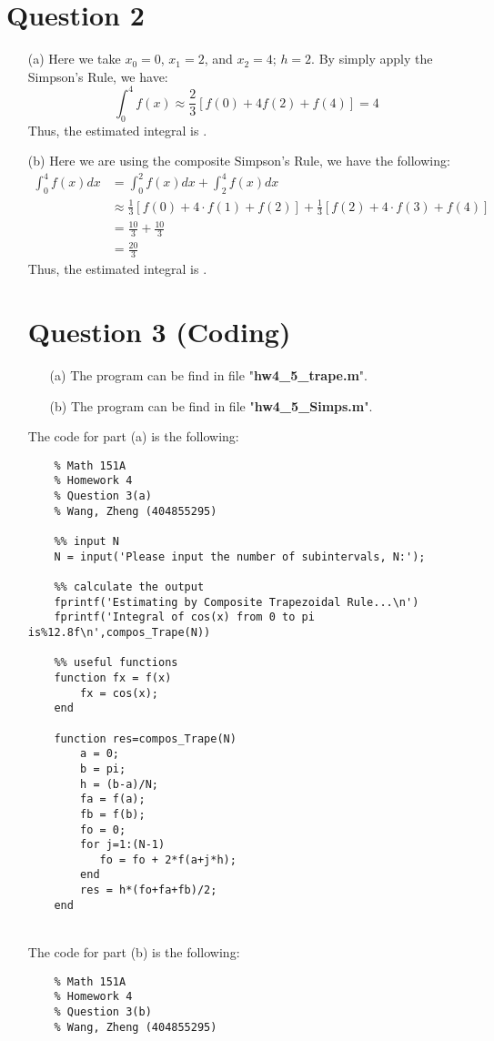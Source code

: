 \documentclass[11pt]{article}
\newcommand*{\boxtex}[1]{\framebox{#1}}
\begin{document}
\section*{Question 2}
\begin{itemize}
	\item [(a)]
	Here we take $ x_0 = 0 $, $ x_1  = 2$, and $ x_2  = 4$; $ h = 2 $. By simply apply the Simpson's Rule, we have:
	\[ \int_{0}^{4} f(x) \approx \frac{2}{3}[f(0) + 4f(2) + f(4)] = 4 \]
	Thus, the estimated integral is \boxtex{$ \int_{0}^{4}f(x)dx \approx 4 $}.
	
	\item [(b)]
	Here we are using the composite Simpson's Rule, we have the following:
	\begin{equation*}
	\begin{aligned}
	\int_{0}^{4} f(x) dx &= \int_{0}^{2} f(x) dx + \int_{2}^{4} f(x) dx\\
	&\approx \frac{1}{3}[f(0) + 4\cdot f(1) + f(2)] + \frac{1}{3}[f(2) + 4\cdot f(3) + f(4)]\\
	&= \frac{10}{3} + \frac{10}{3}\\
	&=\frac{20}{3}
	\end{aligned}
	\end{equation*}
	Thus, the estimated integral is \boxtex{$ \int_{0}^{4}f(x)dx \approx \frac{20}{3} $}.
	
\section*{Question 3 (Coding)}
\begin{itemize}
	\item [(a)]
	The program can be find in file "\textbf{hw4\_5\_trape.m}".
	\item [(b)]
	The program can be find in file "\textbf{hw4\_5\_Simps.m}".
\end{itemize}	
	The code for part (a) is the following:
	\begin{verbatim}
	% Math 151A
	% Homework 4
	% Question 3(a)
	% Wang, Zheng (404855295)
	
	%% input N
	N = input('Please input the number of subintervals, N:');
	
	%% calculate the output
	fprintf('Estimating by Composite Trapezoidal Rule...\n')
	fprintf('Integral of cos(x) from 0 to pi is%12.8f\n',compos_Trape(N))
	
	%% useful functions
	function fx = f(x)
	    fx = cos(x);
	end
	
	function res=compos_Trape(N)
	    a = 0;
	    b = pi;
    	h = (b-a)/N;
	    fa = f(a);
	    fb = f(b);
	    fo = 0;
	    for j=1:(N-1)
	       fo = fo + 2*f(a+j*h);
	    end
	    res = h*(fo+fa+fb)/2;
	end
	\end{verbatim}
	\hfill\\
	The code for part (b) is the following:
	\begin{verbatim}
	% Math 151A
	% Homework 4
	% Question 3(b)
	% Wang, Zheng (404855295)
	

\end{verbatim}
\end{itemize}
\end{document}

